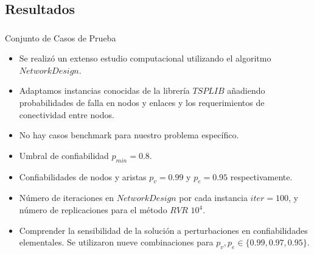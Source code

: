 \subsection{Resultados}
\begin{frame}\frametitle{}
\begin{block}{Conjunto de Casos de Prueba}
\begin{small}
\begin{itemize}
 \item Se realizó un extenso estudio computacional utilizando el algoritmo $NetworkDesign$.
 \item Adaptamos instancias conocidas de la librería $TSPLIB$ añadiendo probabilidades de falla en nodos y enlaces y los requerimientos de conectividad entre nodos.
  \item No hay casos benchmark para nuestro problema específico.
 \item Umbral de confiabilidad $p_{min}=0.8$.
 \item Confiabilidades de nodos y aristas $p_v=0.99$ y $p_e=0.95$ respectivamente.
 \item Número de iteraciones en $NetworkDesign$ por cada instancia $iter=100$, y número de replicaciones para el método $RVR$ $10^4$.
 \item Comprender la sensibilidad de la solución a perturbaciones en confiabilidades elementales. Se utilizaron nueve combinaciones para $p_{v},p_{e} \in \{0.99, 0.97,0.95\}$.
\end{itemize} 
\end{small}
\end{block}
\end{frame}

